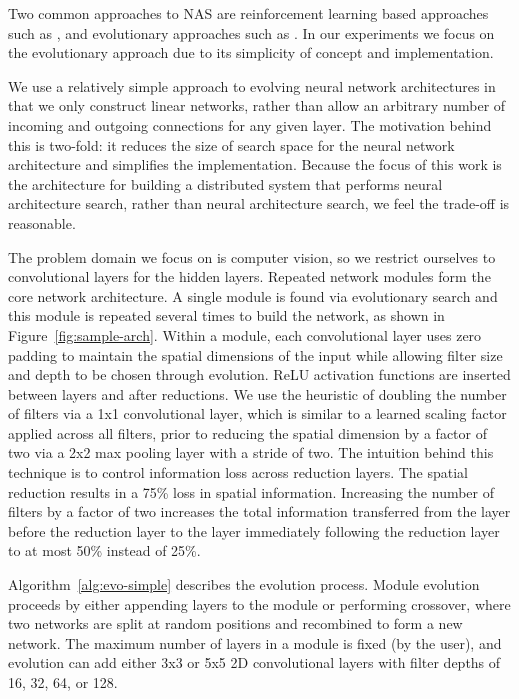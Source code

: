 \documentclass[conference]{IEEEtran}
\begin{document}
Two common approaches to NAS are reinforcement learning based approaches such
as \cite{45826, Kyriakides:2018:NAS:3200947.3208068, pmlr-v80-pham18a}, and
evolutionary approaches such as \cite{DBLP:journals/corr/abs-1711-00436,
  DBLP:journals/corr/MiikkulainenLMR17, DBLP:conf/icml/RealMSSSTLK17}. In our
experiments we focus on the evolutionary approach due to its simplicity of
concept and implementation.

We use a relatively simple approach to evolving neural network architectures in
that we only construct linear networks, rather than allow an arbitrary number of
incoming and outgoing connections for any given layer. The motivation behind
this is two-fold: it reduces the size of search space for the neural network
architecture and simplifies the implementation. Because the focus of this work
is the architecture for building a distributed system that performs neural architecture
search, rather than neural architecture search, we feel the
trade-off is reasonable.
% 

The problem domain we focus on is computer vision, so we restrict ourselves
to convolutional layers for the hidden layers. Repeated network modules
form the core network architecture. A single module is found via evolutionary
search and this module is repeated several times to build the network, as
shown in Figure~\ref{fig:sample-arch}.
Within a module, each convolutional layer uses zero padding to maintain the
spatial dimensions of the input while allowing filter size and depth to be
chosen through evolution. ReLU activation functions are inserted between
layers and after reductions.
We use the heuristic of doubling the number of filters
via a 1x1 convolutional layer, which is similar to a learned scaling
factor applied across all filters, prior to reducing the spatial dimension by a
factor of two via a 2x2 max pooling layer with a stride of two.
The intuition behind this
technique is to control information loss across reduction layers. The spatial
reduction results in a 75\% loss in spatial information. Increasing the
number of filters by a factor of two increases the total information transferred
from the layer before the reduction layer to the layer immediately following
the reduction layer to at most 50\% instead of 25\%.

Algorithm~\ref{alg:evo-simple} describes the evolution process.
Module evolution proceeds by either appending layers to the module or performing
crossover, where two networks are split at random positions and recombined
to form a new network. The maximum number of layers in a module is fixed
(by the user), and evolution can add either 3x3 or 5x5 2D convolutional
layers with filter depths of 16, 32, 64, or 128.
\end{document}
